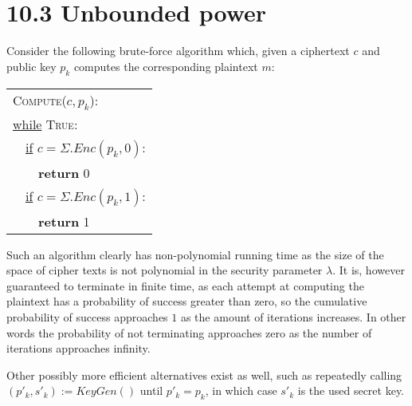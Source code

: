 \documentclass{report}
\begin{document}
	\section*{10.3 Unbounded power}
		Consider the following brute-force algorithm which, given a ciphertext $c$ and public key $p_k$ computes the corresponding plaintext $m$:
		
		\begin{center}
			\begin{tabular}{|l|}
				\hline
				\textsc{Compute}($c, p_k$): \\
		  		\underline{while} \textsc{True}: \\
		    	\ \ \underline{if} $c = \Sigma.Enc(p_k, 0)$: \\
		      	\ \ \ \ \textbf{return} 0 \\
		    	\ \ \underline{if} $c = \Sigma.Enc(p_k, 1)$: \\
		      	\ \ \ \ \textbf{return} 1 \\
		  		\hline
			\end{tabular}
		\end{center}

		Such an algorithm clearly has non-polynomial running time as the size of the space of cipher texts is not polynomial in the security parameter $\lambda$. It is, however guaranteed to terminate in finite time, as each attempt at computing the plaintext has a probability of success greater than zero, so the cumulative probability of success approaches $1$ as the amount of iterations increases. In other words the probability of not terminating approaches zero as the number of iterations approaches infinity.

		Other possibly more efficient alternatives exist as well, such as repeatedly calling $(p'_k, s'_k) := KeyGen()$ until $p'_k = p_k$, in which case $s'_k$ is the used secret key.
	
\end{document}
